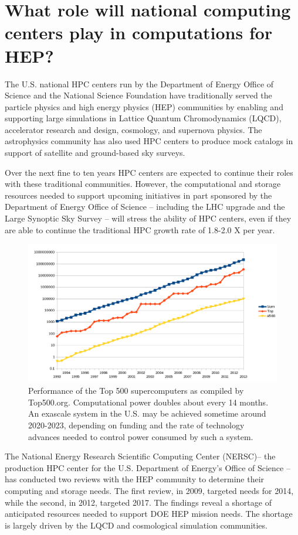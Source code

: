 \section{What role will national computing centers play in computations for HEP?}

The U.S. national HPC centers run by the Department of Energy Office of Science and the National Science Foundation have traditionally served the particle physics and high energy physics (HEP) communities by enabling and supporting large simulations in Lattice Quantum Chromodynamics (LQCD), accelerator research and design, cosmology, and supernova physics. The astrophysics community has also used HPC centers to produce mock catalogs in support of satellite and ground-based sky surveys.
 
Over the next fine to ten years HPC centers are expected to continue their roles with these traditional communities. However, the computational and storage resources needed to support upcoming initiatives in part sponsored by the Department of Energy Office of Science -- including the LHC upgrade and  the Large Synoptic Sky Survey -- will stress the ability of HPC centers, even if they are able to continue the traditional HPC growth rate of 1.8-2.0 X per year.

\begin{figure}[h]
\includegraphics[width=\textwidth]{CpF-I2/images/Top500-plot.png}
\caption{Performance of the Top 500 supercomputers as compiled by Top500.org.  Computational power doubles about every 14 months. An exascale system in the U.S. may be achieved sometime around 2020-2023, depending on funding and the rate of technology advances needed to control power consumed by such a system.}
\label{fig:Top-500}
\end{figure}

The National Energy Research Scientific Computing Center (NERSC)-- the production HPC center for the U.S. Department of Energy's Office of Science -- has conducted two reviews with the HEP community to determine their computing and storage needs. The first review, in 2009, targeted needs for 2014, while the second, in 2012, targeted 2017.  The findings reveal a shortage of anticipated resources needed to support DOE HEP mission needs. 
The shortage is largely driven by the LQCD and cosmological simulation communities. 


